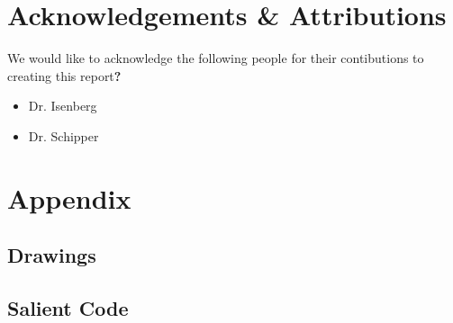 \documentclass[12pt]{report}
\renewcommand\thesection{\arabic{section}}
\begin{document}

% 
% 

\newpage
\section*{Acknowledgements \& Attributions}
We would like to acknowledge the following people for their contibutions to creating this report\textbf{?}
\begin{itemize}
  \item Dr. Isenberg
  \item Dr. Schipper
\end{itemize}

\newpage
\appendix
\renewcommand\thesection{\Roman{section}}
\renewcommand\thesubsection{\roman{subsection}}
\section{Appendix}\label{sec:app}
\subsection{Drawings}
\subsection{Salient Code}
% 
\end{document}
